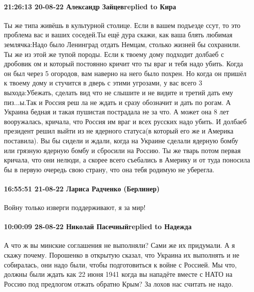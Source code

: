  
 
 
 
 

\paragraph{21:26:13 20-08-22 Александр Зайцевreplied to Кира}

Ты же типа живёшь в культурной столице. Если в вашем подъезде ссут, то это
проблема вас и ваших соседей.Ты ещё дура скажи, как ваша блять любимая
землячка:Надо было Ленинград отдать Немцам, столько жизней бы сохранили. Ты же
из этой же тупой породы. Если к твоему дому подходит долбаеб с дробовик ом и
который постоянно кричит что ты враг и тебя надо убить. Когда он был через 5
огородов, вам наверно на него было похрен. Но когда он пришёл к твоему дому и
стучится в дверь с этими угрозами, у вас всего 3 выхода:Убежать, сделать вид
что не слышите и не видите и третий дать ему пиз...ы.Так и Россия реш ла не
ждать и сразу обозначит и дать по рогам. А Украина бедная и такая пушистая
пострадала не за что. А может она 8 лет вооружалась, кричала, что Россия им
враг и всех русских надо убить. И долбаеб президент решил выйти из не ядерного
статуса(в который его же и Америка поставила). Вы бы сидели и ждали, когда на
Украине сделали ядерную бомбу или грязную ядерную бомбу и сбросили на Россию.
Ты же тварь потом первая кричала, что они нелюди, а скорее всего съебались в
Америку и от туда поносила бы в первую очередь свою страну, что она тебя
родимую не уберегла.

\paragraph{16:55:51 21-08-22 Лариса Радченко (Берлинер)}

Войну только изверги поддерживают, я за мир!

\paragraph{10:00:09 28-08-22 Николай Пасечныйreplied to Надежда}

А что ж вы минские соглашения не выполняли? Сами же их придумали. А я скажу
почему. Порошенко в открытую сказал, что Украина их выполнять и не собиралась,
они надо были, чтобы подготовиться к войне с Россией. Мы что, должны были ждать
как 22 июня 1941 когда вы нападёте вместе с НАТО на Россию под предлогом отжать
обратно Крым? За лохов нас считать не надо.

